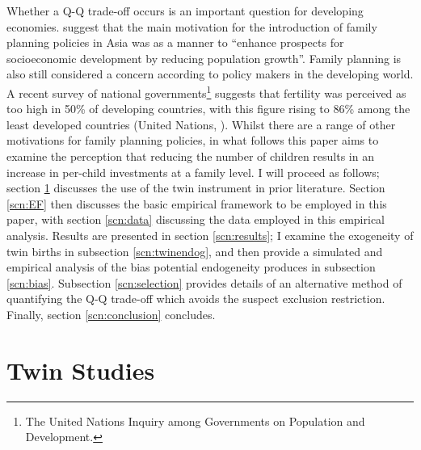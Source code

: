 \documentclass{article}[11pt,subeqn]
\begin{document}
\begin{spacing}{1.5}
Whether a Q-Q trade-off occurs is an important question for developing economies.  \citet{Clelandetal2006} suggest that the main motivation for the introduction of family 
planning policies in Asia was as a manner to ``enhance prospects for socioeconomic development by reducing population growth''.  Family planning is also still considered a 
concern according to policy makers in the developing world.  A recent survey of national governments\footnote{The United Nations Inquiry among Governments on Population and 
Development.} suggests that fertility was perceived as too high in 50\% of developing countries, with this figure rising to 86\% among the least developed countries (United 
Nations, \citeyear{UN2010}).   Whilst there are a range of other motivations for family planning policies, in what follows this paper aims to examine the perception that 
reducing the number of children results in an increase in per-child investments at a family level.  I will proceed as follows; section \ref{scn:lit} discusses the use of 
the twin instrument in prior literature.  Section \ref{scn:EF} then discusses the basic empirical framework to be employed in this paper, with section \ref{scn:data} discussing 
the data employed in this empirical analysis.  Results are presented in section \ref{scn:results}; I examine the exogeneity of twin births in subsection \ref{scn:twinendog}, 
and then provide a simulated and empirical analysis of the bias potential endogeneity produces in subsection \ref{scn:bias}. Subsection \ref{scn:selection} provides details of an 
alternative method of quantifying the Q-Q trade-off which avoids the suspect exclusion restriction.  Finally, section \ref{scn:conclusion} concludes. 

\section{Twin Studies}
\label{scn:lit}



\vspace{-5mm}

\end{spacing}
\end{document}
